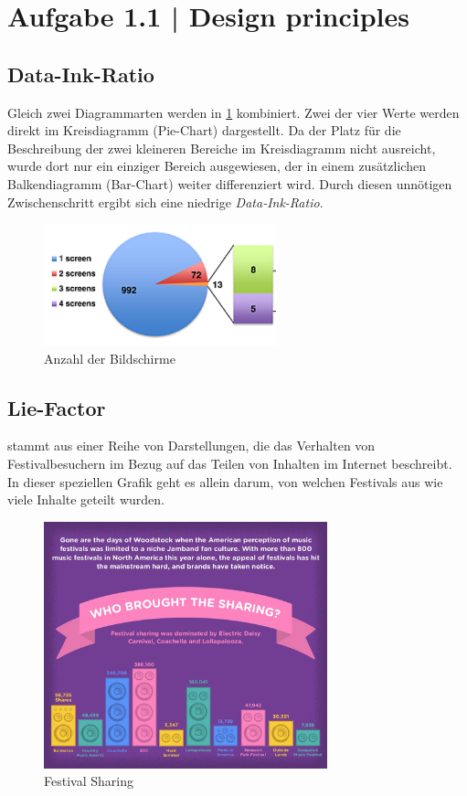 \documentclass[a4paper,12pt,ngerman]{scrartcl}
\begin{document}
\pagestyle{fancy} %

\section{Aufgabe 1.1 | Design principles}

\subsection*{Data-Ink-Ratio}

Gleich zwei Diagrammarten werden in \cref{screens} kombiniert. Zwei der vier Werte werden direkt im Kreisdiagramm (Pie-Chart) dargestellt. Da der Platz für die Beschreibung der zwei kleineren Bereiche im Kreisdiagramm nicht ausreicht, wurde dort nur ein einziger Bereich ausgewiesen, der in einem zusätzlichen Balkendiagramm (Bar-Chart) weiter differenziert wird. Durch diesen unnötigen Zwischenschritt ergibt sich eine niedrige \emph{Data-Ink-Ratio}.

\begin{figure}[ht]
    \centering
    \includegraphics[width=0.6\textwidth]{includes/screens}
    \caption{Anzahl der Bildschirme}
    \label{screens}
\end{figure}

\subsection*{Lie-Factor}
 stammt aus einer Reihe von Darstellungen, die das Verhalten von Festivalbesuchern im Bezug auf das Teilen von Inhalten im Internet beschreibt. In dieser speziellen Grafik geht es allein darum, von welchen Festivals aus wie viele Inhalte geteilt wurden.

\begin{figure}[ht]
    \centering
    \includegraphics[width=0.73\textwidth]{includes/festival_sharing}
    \caption{Festival Sharing}
    \label{festival_sharing}
\end{figure}
\end{document}
